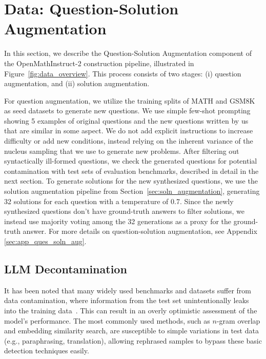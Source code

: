 \section{Data: Question-Solution Augmentation}

In this section, we describe the Question-Solution Augmentation component of the OpenMathInstruct-2 construction pipeline, illustrated in Figure~\ref{fig:data_overview}. This process consists of two stages: (i) question augmentation, and (ii) solution augmentation.


For question augmentation, we utilize the training splits of MATH and GSM8K as seed datasets to generate new questions. We use simple few-shot prompting showing 5 examples of original questions and the new questions written by us that are similar in some aspect. We do not add explicit instructions to increase difficulty or add new conditions, instead relying on the inherent variance of the nucleus sampling that we use to generate new problems.
After filtering out syntactically ill-formed questions, we check the generated questions for potential contamination with test sets of evaluation benchmarks, described in detail in the next section. 
To generate solutions for the new synthesized questions, we use the solution augmentation pipeline from Section~\ref{sec:soln_augmentation}, generating 32 solutions for each question with a temperature of 0.7. Since the newly synthesized questions don't have ground-truth answers to filter solutions, we instead use majority voting among the 32 generations as a proxy for the ground-truth answer.
For more details on question-solution augmentation, see Appendix \ref{sec:app_ques_soln_aug}. 






\subsection{LLM Decontamination}
\label{sec:llm_decontamination}

It has been noted that many widely used benchmarks and datasets suffer from data contamination, where information from the test set unintentionally leaks into the training data~\citep{yang2023rethinkingbenchmarkcontaminationlanguage}. 
This can result in an overly optimistic assessment of the model's performance. 
The most commonly used methods, such as $n$-gram overlap and embedding similarity search, are susceptible to simple variations in test data (e.g., paraphrasing, translation), allowing rephrased samples to bypass these basic detection techniques easily. 

